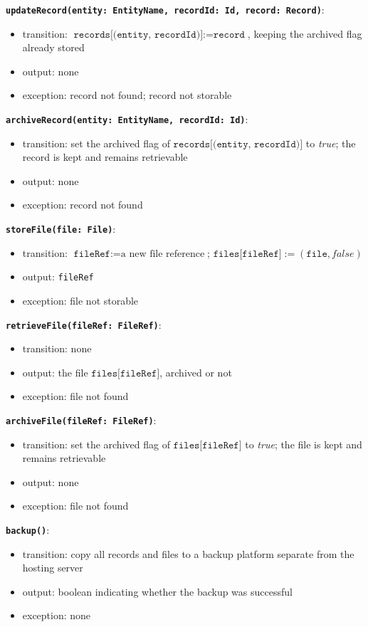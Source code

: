 \documentclass[12pt, titlepage]{article}
\begin{document}
\textbf{\texttt{updateRecord(entity: EntityName, recordId: Id, record: Record)}}:
\begin{itemize}
  \item transition: $\texttt{records[(entity, recordId)]} := \texttt{record}$, keeping the archived flag already stored
  \item output: none
  \item exception: record not found; record not storable
\end{itemize}

\textbf{\texttt{archiveRecord(entity: EntityName, recordId: Id)}}:
\begin{itemize}
  \item transition: set the archived flag of $\texttt{records[(entity, recordId)]}$ to \textit{true}; the record is kept and remains retrievable
  \item output: none
  \item exception: record not found
\end{itemize}

\textbf{\texttt{storeFile(file: File)}}:
\begin{itemize}
  \item transition: $\texttt{fileRef} := \text{a new file reference}$; $\texttt{files[fileRef]} := (\texttt{file}, \textit{false})$
  \item output: \texttt{fileRef}
  \item exception: file not storable
\end{itemize}

\textbf{\texttt{retrieveFile(fileRef: FileRef)}}:
\begin{itemize}
  \item transition: none
  \item output: the file $\texttt{files[fileRef]}$, archived or not
  \item exception: file not found
\end{itemize}

\textbf{\texttt{archiveFile(fileRef: FileRef)}}:
\begin{itemize}
  \item transition: set the archived flag of $\texttt{files[fileRef]}$ to \textit{true}; the file is kept and remains retrievable
  \item output: none
  \item exception: file not found
\end{itemize}

\textbf{\texttt{backup()}}:
\begin{itemize}
  \item transition: copy all records and files to a backup platform separate from the hosting server
  \item output: boolean indicating whether the backup was successful
  \item exception: none
\end{itemize}
\end{document}
